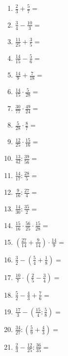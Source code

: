 \begin{Exercise}[title={Berechne die folgenden Ausdrücke und kürze soweit wie möglich}, label=bruecheA1]
	
	\begin{minipage}{\textwidth}
		\begin{minipage}{0.49\textwidth}
			\begin{enumerate}[label=\alph*)]
				\item \(\frac{2}{3}+\frac{5}{7}=\)
				\item \(\frac{3}{4}-\frac{10}{3}=\)
				\item \(\frac{11}{25}+\frac{3}{5}=\)
				\item \(\frac{14}{15}-\frac{5}{6}=\)
				\item \(\frac{14}{9}+\frac{7}{18}=\)
				\item \(\frac{14}{15}\cdot\frac{5}{28}=\)
				\item \(\frac{30}{77}\cdot\frac{49}{24}=\)
				\item \(\frac{5}{28}\cdot\frac{8}{7}=\)
				\item \(\frac{12}{25}\cdot\frac{15}{16}=\)
				\item \(\frac{13}{42}:\frac{39}{56}=\)
				\item \(\frac{14}{17}:\frac{28}{5}=\)
				\item \(\frac{9}{16}:\frac{27}{4}=\)
				\item \(\frac{14}{30}:\frac{35}{2}=\)
			\end{enumerate}
		\end{minipage}
		\begin{minipage}{0.49\textwidth}
			\begin{enumerate}[label=\alph*)]
				\setcounter{enumi}{13}
				\item \(\frac{15}{16}\cdot\frac{56}{25}\cdot\frac{15}{28}=\)
				\item \(\left( \frac{27}{14}+\frac{9}{14}\right) \cdot \frac{14}{9}=\)
				\item \(\frac{3}{2}-\left( \frac{5}{4}+\frac{1}{8}\right) =\)
				\item \(\frac{10}{7}\cdot\left( \frac{2}{5}-\frac{3}{4}\right) =\)
				\item \(\frac{5}{2}-\frac{4}{3}+\frac{7}{6}=\)
				\item \(\frac{17}{3}-\left( \frac{15}{4}:\frac{5}{8}\right) =\)
				\item \(\frac{34}{27}:\left( \frac{5}{9}+\frac{4}{3}\right) =\)
				\item \(\frac{2}{3}-\frac{12}{25}:\frac{36}{35}=\)

\end{enumerate}
\end{minipage}
\end{minipage}
\end{Exercise}
